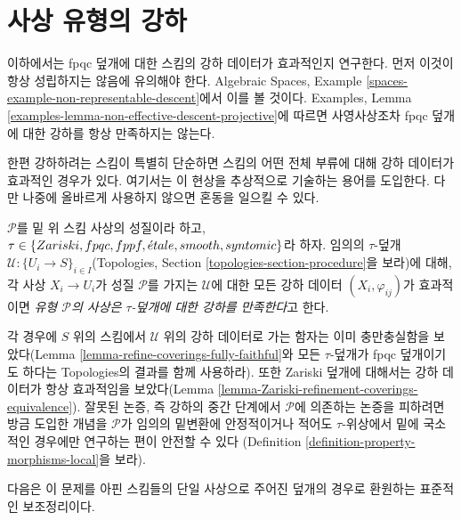 \section{사상 유형의 강하}
\label{section-descending-types-morphisms}

\noindent
이하에서는 fpqc 덮개에 대한 스킴의 강하 데이터가 효과적인지 연구한다.
먼저 이것이 항상 성립하지는 않음에 유의해야 한다. Algebraic Spaces,
Example \ref{spaces-example-non-representable-descent}에서 이를 볼 것이다.
Examples, Lemma \ref{examples-lemma-non-effective-descent-projective}에
따르면 사영사상조차 fpqc 덮개에 대한 강하를 항상 만족하지는 않는다.

\medskip\noindent
한편 강하하려는 스킴이 특별히 단순하면 스킴의 어떤 전체 부류에 대해
강하 데이터가 효과적인 경우가 있다. 여기서는 이 현상을 추상적으로
기술하는 용어를 도입한다. 다만 나중에 올바르게 사용하지 않으면 혼동을
일으킬 수 있다.

\begin{definition}
\label{definition-descending-types-morphisms}
$\mathcal{P}$를 밑 위 스킴 사상의 성질이라 하고,
$\tau \in \{Zariski, fpqc, fppf, {\acute{e}tale}, smooth, syntomic\}$라 하자. 임의의
$\tau$-덮개 $\mathcal{U} : \{U_i \to S\}_{i \in I}$(Topologies, Section
\ref{topologies-section-procedure}을 보라)에 대해, 각 사상 $X_i \to U_i$가
성질 $\mathcal{P}$를 가지는 $\mathcal{U}$에 대한 모든 강하 데이터
$(X_i, \varphi_{ij})$가 효과적이면 {\it 유형 $\mathcal{P}$의 사상은
$\tau$-덮개에 대한 강하를 만족한다}고 한다.
\end{definition}

\noindent
각 경우에 $S$ 위의 스킴에서 $\mathcal{U}$ 위의 강하 데이터로 가는 함자는
이미 충만충실함을 보았다(Lemma
\ref{lemma-refine-coverings-fully-faithful}와 모든 $\tau$-덮개가 fpqc
덮개이기도 하다는 Topologies의 결과를 함께 사용하라). 또한 Zariski
덮개에 대해서는 강하 데이터가 항상 효과적임을 보았다(Lemma
\ref{lemma-Zariski-refinement-coverings-equivalence}). 잘못된 논증, 즉
강하의 중간 단계에서 $\mathcal{P}$에 의존하는 논증을 피하려면 방금
도입한 개념을 $\mathcal{P}$가 임의의 밑변환에 안정적이거나 적어도
$\tau$-위상에서 밑에 국소적인 경우에만 연구하는 편이 안전할 수 있다
(Definition \ref{definition-property-morphisms-local}을 보라).

\medskip\noindent
다음은 이 문제를 아핀 스킴들의 단일 사상으로 주어진 덮개의 경우로
환원하는 표준적인 보조정리이다.

